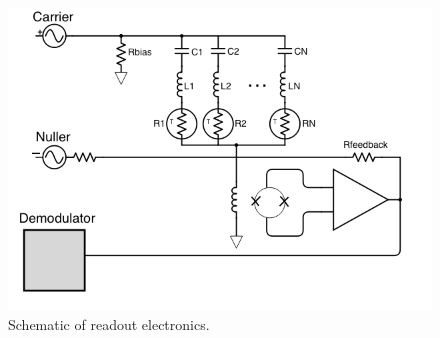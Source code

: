 
\begin{figure}[htbp]
\begin{center}
\includegraphics[width=0.6\columnwidth]{figures/dfmux_schematic.png}
\caption[DFMUX schematic]{Schematic of readout electronics. 
\label{fig:dfmux} }
\end{center}
\end{figure}


 






 








